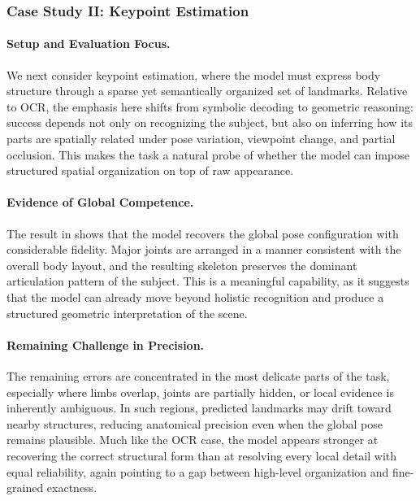 \subsubsection{Case Study II: Keypoint Estimation}

\paragraph{Setup and Evaluation Focus.}
We next consider keypoint estimation, where the model must express body structure through a sparse yet semantically organized set of landmarks. Relative to OCR, the emphasis here shifts from symbolic decoding to geometric reasoning: success depends not only on recognizing the subject, but also on inferring how its parts are spatially related under pose variation, viewpoint change, and partial occlusion. This makes the task a natural probe of whether the model can impose structured spatial organization on top of raw appearance.

\paragraph{Evidence of Global Competence.}
The result in  shows that the model recovers the global pose configuration with considerable fidelity. Major joints are arranged in a manner consistent with the overall body layout, and the resulting skeleton preserves the dominant articulation pattern of the subject. This is a meaningful capability, as it suggests that the model can already move beyond holistic recognition and produce a structured geometric interpretation of the scene.

\paragraph{Remaining Challenge in Precision.}
The remaining errors are concentrated in the most delicate parts of the task, especially where limbs overlap, joints are partially hidden, or local evidence is inherently ambiguous. In such regions, predicted landmarks may drift toward nearby structures, reducing anatomical precision even when the global pose remains plausible. Much like the OCR case, the model appears stronger at recovering the correct structural form than at resolving every local detail with equal reliability, again pointing to a gap between high-level organization and fine-grained exactness.


